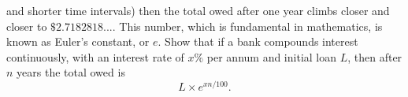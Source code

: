 \begin{questions}
\begin{parts}
            and shorter time intervals) then the total owed after one year climbs closer and closer to $ \$2.7182818... $. This number, which
            is fundamental in mathematics, is known as Euler's constant, or $ e $. Show that if a bank compounds interest continuously, with an
            interest rate of $ x\% $ per annum and initial loan $ L $, then after $ n $ years the total owed is
            \begin{displaymath}
              L \times e^{xn/100}.
            \end{displaymath}
    \end{parts}
\end{questions}


